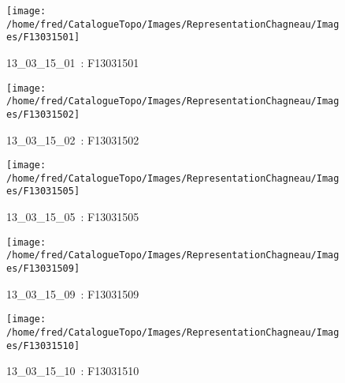 \documentclass[12pt,titlepage,oneside]{book}
\begin{document}
\begin{figure}[h!]
  \hfill         %
  \begin{minipage}[t]{3cm}
    \begin{center}
      \texttt{[image: /home/fred/CatalogueTopo/Images/RepresentationChagneau/Images/F13031501]}
      \caption[~13\_03\_15\_01]{\small{13\_03\_15\_01~:} \tiny{F13031501}}\label{F13031501}
    \end{center}
  \end{minipage}
  \begin{minipage}[t]{3cm}
    \begin{center}
      \texttt{[image: /home/fred/CatalogueTopo/Images/RepresentationChagneau/Images/F13031502]}
      \caption[~13\_03\_15\_02]{\small{13\_03\_15\_02~:} \tiny{F13031502}}\label{F13031502}
    \end{center}
  \end{minipage}
  \begin{minipage}[t]{3cm}
    \begin{center}
      \texttt{[image: /home/fred/CatalogueTopo/Images/RepresentationChagneau/Images/F13031505]}
      \caption[~13\_03\_15\_05]{\small{13\_03\_15\_05~:} \tiny{F13031505}}\label{F13031505}
    \end{center}
  \end{minipage}
  \begin{minipage}[t]{3cm}
    \begin{center}
      \texttt{[image: /home/fred/CatalogueTopo/Images/RepresentationChagneau/Images/F13031509]}
      \caption[~13\_03\_15\_09]{\small{13\_03\_15\_09~:} \tiny{F13031509}}\label{F13031509}
    \end{center}
  \end{minipage}
  \begin{minipage}[t]{3cm}
    \begin{center}
      \texttt{[image: /home/fred/CatalogueTopo/Images/RepresentationChagneau/Images/F13031510]}
      \caption[~13\_03\_15\_10]{\small{13\_03\_15\_10~:} \tiny{F13031510}}\label{F13031510}
    \end{center}
  \end{minipage}
  \begin{minipage}[t]{3cm}

\end{minipage}
\end{figure}
\end{document}
